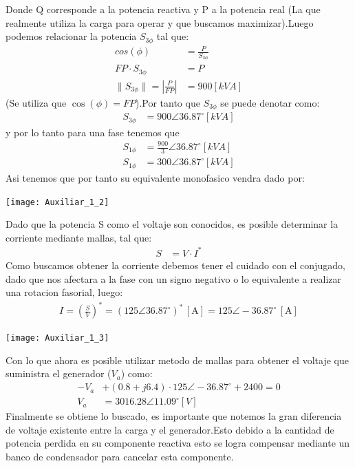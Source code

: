\documentclass[
  11pt,
  letterpaper,
   addpoints,
   answers
  ]{exam}
\begin{document}
\begin{questions}
\begin{solution}
\begin{center}
    \end{center}
    Donde Q corresponde a la potencia reactiva y P a la potencia real (La que realmente utiliza la carga para operar y que buscamos maximizar).Luego podemos relacionar la potencia $S_{3\phi}$ tal que:
    \begin{align}
        cos(\phi) &= \frac{P}{S_{3\phi}}\\
        FP \cdot S_{3\phi}&= P\\
        \|S_{3\phi}\| = \left|\frac{P}{FP} \right| &= 900[kVA]
    \end{align}
    (Se utiliza que $\cos(\phi) = FP$).Por tanto que $S_{3\phi}$ se puede denotar como:
    \begin{align}
        S_{3\phi} &= 900 \angle 36.87^{\circ} [kVA]
    \end{align}
    y por lo tanto para una fase tenemos que 
    \begin{align}
        S_{1\phi} &= \frac{900}{3} \angle 36.87^{\circ} [kVA]\\
        S_{1\phi} &= 300 \angle 36.87^{\circ} [kVA]
    \end{align}
    Asi tenemos que por tanto su equivalente monofasico vendra dado por:
    \begin{center}
        \texttt{[image: Auxiliar\_1\_2]}
      \end{center}
    Dado que la potencia S como el voltaje son conocidos, es posible determinar la corriente mediante mallas, tal que:
    \begin{align}
        S &= V \cdot I^{*} 
    \end{align}
    Como buscamos obtener la corriente debemos tener el cuidado con el conjugado, dado que nos afectara a la fase con un signo negativo o lo equivalente a realizar una rotacion fasorial, luego:
    \begin{align}
        I = \left( \frac{S}{V}\right)^{*} = \left(125 \angle 36.87^{\circ}\right)^{*}\,[\text{A}] = 125 \angle -36.87^{\circ}\,[\text{A}]
    \end{align}
    \begin{center}
        \texttt{[image: Auxiliar\_1\_3]}
      \end{center}
    Con lo que ahora es posible utilizar metodo de mallas para obtener el voltaje que suministra el generador ($V_{a}$) como: 
    \begin{align}
      -V_{a} &+ (0.8 + j6.4) \cdot 125 \angle -36.87^{\circ} + 2400 = 0\\
      V_{a} &= 3016.28 \angle 11.09^{\circ} [V]
    \end{align}
Finalmente se obtiene lo buscado, es importante que notemos la gran diferencia de voltaje existente entre la carga y el generador.Esto debido a la cantidad de potencia perdida en su componente reactiva esto se logra compensar mediante un banco de condensador para cancelar esta componente.

\end{solution}
\end{questions}
\end{document}
